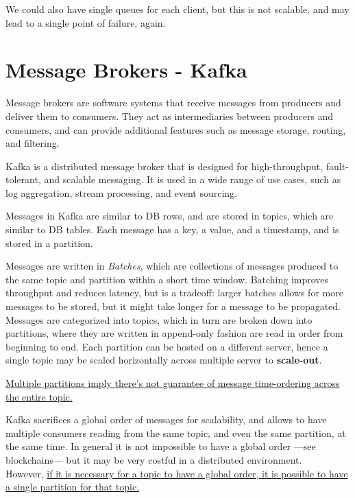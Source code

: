 We could also have single queues for each client, but this is not scalable, and may lead to a single point of failure, again.

\section{Message Brokers - Kafka}
Message brokers are software systems that receive messages from producers and deliver them to consumers. They act as intermediaries between producers and consumers, and can provide additional features such as message storage, routing, and filtering.

Kafka is a distributed message broker that is designed for high-throughput, fault-tolerant, and scalable messaging. It is used in a wide range of use cases, such as log aggregation, stream processing, and event sourcing.

Messages in Kafka are similar to DB rows, and are stored in topics, which are similar to DB tables. Each message has a key, a value, and a timestamp, and is stored in a partition.

Messages are written in \textit{Batches}, which are collections of messages produced to the same topic and partition within a short time window. Batching improves throughput and reduces latency, but is a tradeoff: larger batches allows for more messages to be stored, but it might take longer for a message to be propagated.
\\


Messages are categorized into topics, which in turn are broken down into partitions, where they are written in append-only fashion are read in order from beginning to end.
Each partition can be hosted on a different server, hence a single topic may be scaled horizontally across multiple server to \textbf{scale-out}.


\ul{Multiple partitions imply there's not guarantee of message time-ordering across the entire topic.}

Kafka sacrifices a global order of messages for scalability, and allows to have multiple consumers reading from the same topic, and even the same partition, at the same time.
In general it is not impossible to have a global order ---see blockchains--- but it may be very costful in a distributed environment.\\
However, \ul{if it is necessary for a topic to have a global order, it is possible to have a single partition for that topic.}


